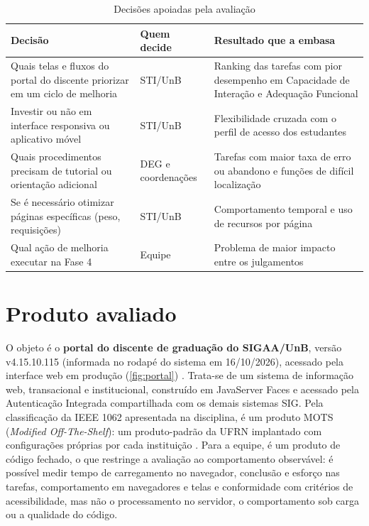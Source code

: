 \begin{table}[htb]
	\caption{Decisões apoiadas pela avaliação}
	\label{tab:decisoes}
	\centering
	\scriptsize
	\begin{tabularx}{\textwidth}{Y L{2.3cm} Y}
		\toprule
		\textbf{Decisão} & \textbf{Quem decide} & \textbf{Resultado que a embasa} \\
		\midrule
		Quais telas e fluxos do portal do discente priorizar em um ciclo de melhoria & STI/UnB & Ranking das tarefas com pior desempenho em Capacidade de Interação e Adequação Funcional \\
		Investir ou não em interface responsiva ou aplicativo móvel & STI/UnB & Flexibilidade cruzada com o perfil de acesso dos estudantes \\
		Quais procedimentos precisam de tutorial ou orientação adicional & DEG e coordenações & Tarefas com maior taxa de erro ou abandono e funções de difícil localização \\
		Se é necessário otimizar páginas específicas (peso, requisições) & STI/UnB & Comportamento temporal e uso de recursos por página \\
		Qual ação de melhoria executar na Fase 4 & Equipe & Problema de maior impacto entre os julgamentos \\
		\bottomrule
	\end{tabularx}
\end{table}

\section{Produto avaliado}
\label{sec:produto}

O objeto é o \textbf{portal do discente de graduação do SIGAA/UnB}, versão v4.15.10.115 (informada no rodapé do sistema em 16/10/2026), acessado pela interface web em produção (\autoref{fig:portal}) \cite{sigaa}. Trata-se de um sistema de informação web, transacional e institucional, construído em JavaServer Faces e acessado pela Autenticação Integrada compartilhada com os demais sistemas SIG. Pela classificação da IEEE 1062 apresentada na disciplina, é um produto MOTS (\textit{Modified Off-The-Shelf}): um produto-padrão da UFRN implantado com configurações próprias por cada instituição \cite{ramos2026processo}. Para a equipe, é um produto de código fechado, o que restringe a avaliação ao comportamento observável: é possível medir tempo de carregamento no navegador, conclusão e esforço nas tarefas, comportamento em navegadores e telas e conformidade com critérios de acessibilidade, mas não o processamento no servidor, o comportamento sob carga ou a qualidade do código.

